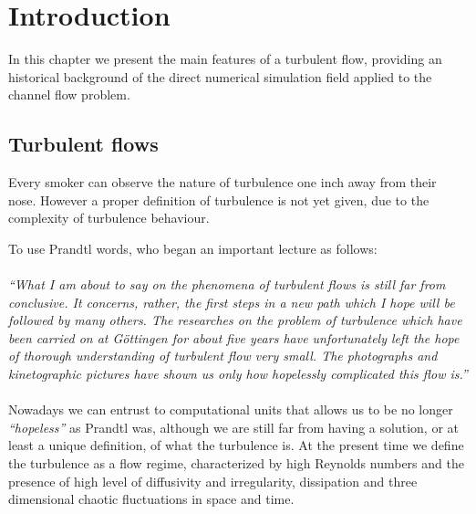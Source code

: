 \chapter{Introduction}

In this chapter we present the main features of a turbulent flow, providing an historical background of the direct numerical simulation field applied to the channel flow problem.

\section{Turbulent flows}
Every smoker can observe the nature of turbulence one inch away from their nose.
However a proper definition of turbulence is not yet given, due to the complexity of turbulence behaviour. \par
To use Prandtl words, who began an important lecture as follows: \\~\\
\emph{``What I am about to say on the phenomena of turbulent flows is still far from conclusive. It concerns, rather, the first steps in a new path which I hope will be followed by many others. The researches on the problem of turbulence which have been carried on at G\"{o}ttingen for about five years have unfortunately left the hope of thorough understanding of turbulent flow very small. The photographs and kinetographic pictures have shown us only how hopelessly complicated this flow is.''} \\~\\

Nowadays we can entrust to computational units that allows us to be no longer \emph{``hopeless''} as Prandtl was, although we are still far from having a solution, or at least a unique definition, of what the turbulence is. 
At the present time we define the turbulence as a flow regime, characterized by high Reynolds numbers and the presence of high level of diffusivity and irregularity, dissipation and three dimensional chaotic fluctuations in space and time\cite{turbulence:def}.


